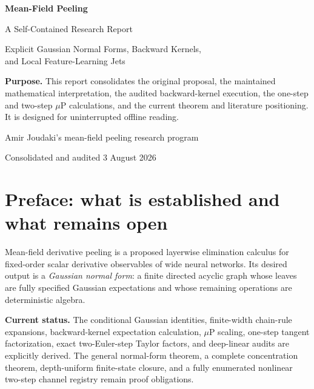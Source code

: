 \documentclass[11pt,oneside]{report}
\begin{document}
\begin{titlepage}
\centering
\vspace*{2.2cm}
{\Huge\bfseries\color{accent} Mean-Field Peeling\par}
\vspace{0.45cm}
{\LARGE A Self-Contained Research Report\par}
\vspace{0.65cm}
{\Large Explicit Gaussian Normal Forms, Backward Kernels,\\
and Local Feature-Learning Jets\par}
\vfill
\begin{tcolorbox}[width=0.86\textwidth,colback=softblue,colframe=accent]
\centering
\textbf{Purpose.}
This report consolidates the original proposal, the maintained mathematical
interpretation, the audited backward-kernel execution, the one-step and
two-step $\mu$P calculations, and the current theorem and literature
positioning.  It is designed for uninterrupted offline reading.
\end{tcolorbox}
\vfill
{\large Amir Joudaki's mean-field peeling research program\par}
\vspace{0.25cm}
{\large Consolidated and audited 3 August 2026\par}
\vspace{1.2cm}
\end{titlepage}

\tableofcontents
\clearpage

\chapter*{Preface: what is established and what remains open}

Mean-field derivative peeling is a proposed layerwise elimination calculus
for fixed-order scalar derivative observables of wide neural networks.  Its
desired output is a \emph{Gaussian normal form}: a finite directed acyclic
graph whose leaves are fully specified Gaussian expectations and whose
remaining operations are deterministic algebra.

\begin{statusbox}
\textbf{Current status.}
The conditional Gaussian identities, finite-width chain-rule expansions,
backward-kernel expectation calculation, $\mu$P scaling, one-step tangent
factorization, exact two-Euler-step Taylor factors, and deep-linear audits are
explicitly derived.  The general normal-form theorem, a complete concentration
theorem, depth-uniform finite-state closure, and a fully enumerated nonlinear
two-step channel registry remain proof obligations.
\end{statusbox}
\end{document}
